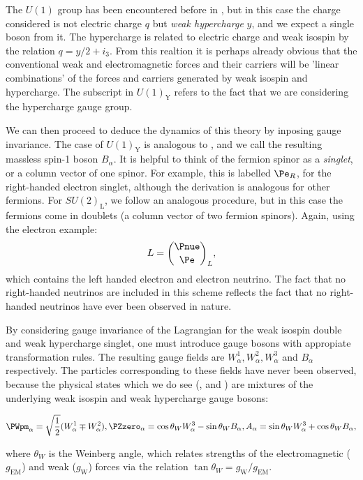 The $U(1)$ group has been encountered before in \QED, but in this case the charge considered is not electric charge $q$ but \emph{weak hypercharge} $y$, and we expect a single boson from it. The hypercharge is related to electric charge and weak isospin by the relation $q=y/2 + i_3$. From this realtion it is perhaps already obvious that the conventional weak and electromagnetic forces and their carriers will be 'linear combinations' of the forces and carriers generated by weak isospin and hypercharge. The subscript in $U(1)_{\textrm{Y}}$ refers to the fact that we are considering the hypercharge gauge group.

We can then proceed to deduce the dynamics of this theory by inposing gauge invariance. The case of  $U(1)_{\textrm{Y}}$ is analogous to \QED, and we call the resulting massless spin-1 boson $B_{\alpha}$. It is helpful to think of the fermion spinor as a \emph{singlet}, or a column vector of one spinor. For example, this is labelled $\Pe_{R}$, for the right-handed electron singlet, although the derivation is analogous for other fermions.
For $SU(2)_{\textrm{L}}$, we follow an analogous procedure, but in this case the fermions come in doublets (a column vector of two fermion spinors). Again, using the electron example:
$$
L=\binom{\Pnue}{\Pe}_{L},
$$
which contains the left handed electron and electron neutrino. The fact that no right-handed neutrinos are included in this scheme reflects the fact that no right-handed neutrinos have ever been observed in nature.

By considering gauge invariance of the Lagrangian for the weak isospin double and weak hypercharge singlet, one must introduce gauge bosons with appropiate transformation rules. The resulting gauge fields are $W_{\alpha}^{1},W_{\alpha}^{2},W_{\alpha}^{3}$ and $B_{\alpha}$ respectively. The particles corresponding to these fields have never been observed, because the physical states which we do see (\PWpm, \PZ and \Pphoton) are mixtures of the underlying weak isospin and weak hypercharge gauge bosons:


\begin{equation}
\label{eq:th:electroweak_gauge_bosons}
\PWpm_{\alpha} = \sqrt{\frac{1}{2}}(W_{\alpha}^{1} \mp W_{\alpha}^{2}) ,
\PZzero_{\alpha} = \cos \theta_{W} W_{\alpha}^{3} - \sin \theta_{W} B_{\alpha} ,
A_{\alpha} = \sin \theta_{W} W_{\alpha}^{3} + \cos \theta_{W} B_{\alpha} ,
\end{equation}

where $\theta_{W}$ is the Weinberg angle, which relates strengths of the electromagnetic ($g_{\textrm{EM}}$) and weak ($g_{\textrm{W}}$) forces via the relation $\tan \theta_{W} = g_{\textrm{W}} /g_{\textrm{EM}}$.

